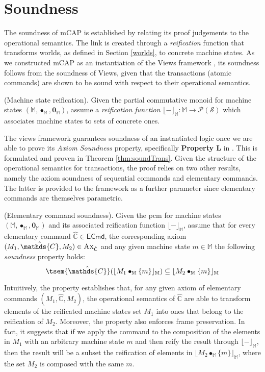\section{Soundness}

\label{sec:mcapSound}

The soundness of mCAP is established by relating its proof judgements to the operational semantics. The link is created through a \textit{reification} function that transforms worlds, as defined in Section \ref{worlds}, to concrete machine states. As we constructed mCAP as an instantiation of the Views framework \cite{views}, its soundness follows from the soundness of Views, given that the transactions (atomic commands) are shown to be sound with respect to their operational semantics.

\begin{param}
	(Machine state reification).
	Given the partial commutative monoid for machine states $(\mathbb{M}, \bullet_\mathbb{M}, \mathbf{0}_\mathbb{M})$, assume a \emph{reification function} $\lfloor - \rfloor_\mathbb{M} : \mathbb{M} \rightarrow \mathcal{P}(\mathcal{S})$ which associates machine states to sets of concrete ones.
\end{param}

The views framework guarantees soundness of an instantiated logic once we are able to prove its \textit{Axiom Soundness} property, specifically \textbf{Property L} in \cite{views}. This is formulated and proven in Theorem \ref{thm:soundTrans}. Given the structure of the operational semantics for transactions, the proof relies on two other results, namely the axiom soundness of sequential commands and elementary commands. The latter is provided to the framework as a further parameter since elementary commands are themselves parametric.

\begin{param}
	\label{param:ecmdSound}
	(Elementary command soundness).
	Given the pcm for machine states $(\mathbb{M}, \bullet_\mathbb{M}, \mathbf{0}_\mathbb{M})$ and its associated reification function $\lfloor - \rfloor_\mathbb{M}$, assume that for every elementary command $\hat{\mathds{C}} \in \mathsf{ECmd}$, the corresponding axiom $(M_1, \hat{\mathds{C}}, M_2) \in \textsc{Ax}_{\hat{\mathsf{C}}}$ and any given machine state $m \in \mathbb{M}$ the following \emph{soundness} property holds:
	\[
		\tsem{\hat{\mathds{C}}}(\lfloor M_1 \bullet_\mathbb{M} \{m\} \rfloor_\mathbb{M}) \subseteq \lfloor M_2 \bullet_\mathbb{M} \{m\} \rfloor_\mathbb{M}
	\]
\end{param}
Intuitively, the property establishes that, for any given axiom of elementary commands $(M_1, \hat{\mathds{C}}, M_2)$, the operational semantics of $\hat{\mathds{C}}$ are able to transform elements of the reificated machine states set $M_1$ into ones that belong to the reification of $M_2$. Moreover, the property also enforces frame preservation. In fact, it suggests that if we apply the command to the composition of the elements in $M_1$ with an arbitrary machine state $m$ and then reify the result through $\lfloor - \rfloor_\mathbb{M}$, then the result will be a subset the reification of elements in $\lfloor M_2 \bullet_\mathbb{M} \{ m \} \rfloor_\mathbb{M}$, where the set $M_2$ is composed with the same $m$.

